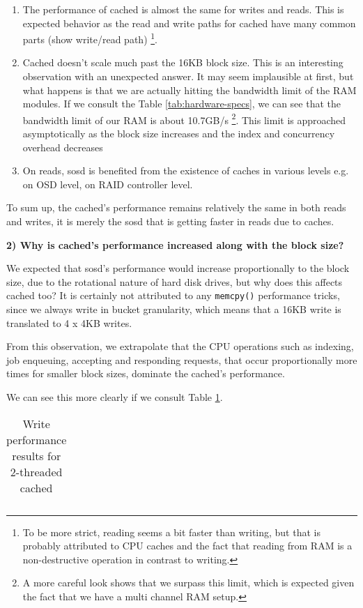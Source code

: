 \begin{enumerate}
	\item The performance of cached is almost the same for writes and 
		reads.  This is expected behavior as the read and write paths 
		for cached have many common parts (\fixme show write/read path)
		\footnote{To be more strict, reading seems a bit faster than 
			writing, but that is probably attributed to CPU caches 
			and the fact that reading from RAM is a non-destructive 
			operation in contrast to writing.}.
	\item Cached doesn't scale much past the 16KB block size. This is an 
		interesting observation with an unexpected answer. It may seem 
		implausible at first, but what happens is that we are actually hitting 
		the bandwidth limit of the RAM modules. If we consult the Table 
		\ref{tab:hardware-specs}, we can see that the bandwidth limit of our 
		RAM is about \mytilde10.7GB/s
		\footnote{A more careful look shows that we surpass this limit, 
			which is expected given the fact that we have a multi 
			channel RAM setup.}.
		This limit is approached asymptotically as the block size increases and 
		the index and concurrency overhead decreases
	\item On reads, sosd is benefited from the existence of caches in various 
		levels e.g. on OSD level, on RAID controller level.
\end{enumerate}

To sum up, the cached's performance remains relatively the same in both reads 
and writes, it is merely the sosd that is getting faster in reads due to 
caches. 

\textbf{2) Why is cached's performance increased along with the block size?}

We expected that sosd's performance would increase proportionally to the block 
size, due to the rotational nature of hard disk drives, but why does this 
affects cached too? It is certainly not attributed to any \texttt{memcpy()} 
performance tricks, since we always write in bucket granularity, which means 
that a 16KB write is translated to 4 x 4KB writes.

From this observation, we extrapolate that the CPU operations such as indexing,
job enqueuing, accepting and responding requests, that occur proportionally 
more times for smaller block sizes, dominate the cached's performance.

We can see this more clearly if we consult Table \ref{tab:2threads}.

\begin{table}[H]
	\centering
	\begin{tabular}{ | l | l | l | l | l |}
		\hline
		
	\end{tabular}
	\caption{Write performance results for 2-threaded cached}
	\label{tab:2threads}
\end{table}

